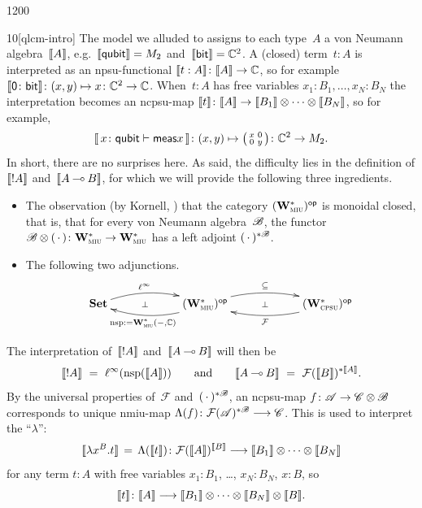 \begin{parsec}{1200}
\begin{point}{10}[qlcm-intro]
The model
we alluded to
assigns to each type~$A$ a von Neumann algebra~$\llbracket A\rrbracket$,%
e.g.~$\llbracket\mathsf{qubit}\rrbracket=M_2$
and~$\llbracket\mathsf{bit}\rrbracket=\mathbb{C}^2$.
A (closed) term~$t:A$
is interpreted as an npsu-functional $\llbracket t:A\rrbracket\colon \llbracket A\rrbracket\to\mathbb{C}$,
so for example $\llbracket\mathsf{0}\colon \mathsf{bit}\rrbracket\colon
(x,y)\mapsto x\colon \mathbb{C}^2\to\mathbb{C}$.
When~$t:A$ has free variables $x_1:B_1,\dotsc,x_N:B_N$
the interpretation 
becomes an ncpsu-map $\llbracket t\rrbracket\colon \llbracket A\rrbracket\to\llbracket B_1\rrbracket\otimes 
\dotsb \otimes \llbracket B_N\rrbracket$,
so for example,
\begin{equation*}
	\llbracket\, x\colon \mathsf{qubit} \vdash \mathsf{meas} x\,\rrbracket
\colon (x,y)\mapsto
\smash{\bigl(
	\begin{smallmatrix}x& 0 \\ 0 & y
	\end{smallmatrix}\bigr)}
\colon \mathbb{C}^2\to M_2.
\end{equation*}
In short, there are no surprises here.
As said, the difficulty lies
in the definition
of $\llbracket!A\rrbracket$ and~$\llbracket A\mathbin{\multimap} B\rrbracket$,
for which we will provide the following
three ingredients.
\begin{itemize}
\item
The observation (by Kornell, \cite{kornell2012})
that
the category 
${(\mathbf{W}^*_{\text{\textsc{miu}}})}{^{\mathsf{op}}}$
is monoidal closed,
that is,
that
for every von Neumann algebra~$\mathscr{B}$,
the functor
$\mathscr{B}\otimes (\,\cdot\,)\colon 
\mathbf{W}^*_{\text{\textsc{miu}}}\to \mathbf{W}^*_{\text{\textsc{miu}}}$
has a left adjoint
$(\,\cdot\,)^{*\mathscr{B}}$.

\item
The following two adjunctions.
\begin{equation*}
\xymatrix@C=6em{
	\Cat{Set}
	\ar@/^1.0em/[r]^-{\ell^\infty}
	\ar@{}[r]|-{\perp}
	&
	\op{(\W{miu})}
	\ar@/^1.0em/[r]^-{\subseteq}
	\ar@/^1.0em/[l]^-{\nsp:=\W{miu}(-,\C)}
	\ar@{}[r]|-{\perp}
	&
	\op{(\W{cpsu})}
	\ar@/^1.0em/[l]^-{\mathcal{F}}
}
\end{equation*}
\end{itemize}
The interpretation of~$\llbracket!A\rrbracket$
and~$\llbracket A\mathbin{\multimap} B\rrbracket$ will then be
\begin{equation*}
\sem{!A}\ =\ 
\linf(\nsp(\sem{A}))
\qquad\text{and}\qquad
\sem{A\limp B}
\ = \ 
\mathcal{F}(\sem{B})^{*\sem{A}}.
\end{equation*}%
By the universal properties of~$\mathcal{F}$
and~$(\,\cdot\,)^{*\mathscr{B}}$,
an ncpsu-map $f\colon \mathscr{A}\rightarrow \mathscr{C}\otimes \mathscr{B}$
corresponds to unique nmiu-map 
$\Lambda(f)\colon \mathcal{F}(\mathscr{A})^{*\mathscr{B}}\longrightarrow \mathscr{C}$.
This is used to interpret 
the ``$\lambda$'':
\begin{equation*}
    \llbracket\lambda x^B. t\rrbracket
    \,=\, \Lambda(\llbracket t\rrbracket)\colon \mathcal{F}(\llbracket A\rrbracket)^{\llbracket B\rrbracket}
    \longrightarrow\llbracket B_1\rrbracket\otimes\dotsb\otimes\llbracket B_N\rrbracket
\end{equation*}
for any term  $t:A$  with free variables
$x_1:B_1$, \ldots, $x_N:B_N$, $x:B$,
so  
\begin{equation*}
\llbracket t\rrbracket \colon \llbracket A\rrbracket\longrightarrow 
\llbracket B_1\rrbracket\otimes\dotsb\otimes\llbracket B_N\rrbracket\otimes \llbracket B\rrbracket.
\end{equation*}


\end{point}
\end{parsec}
